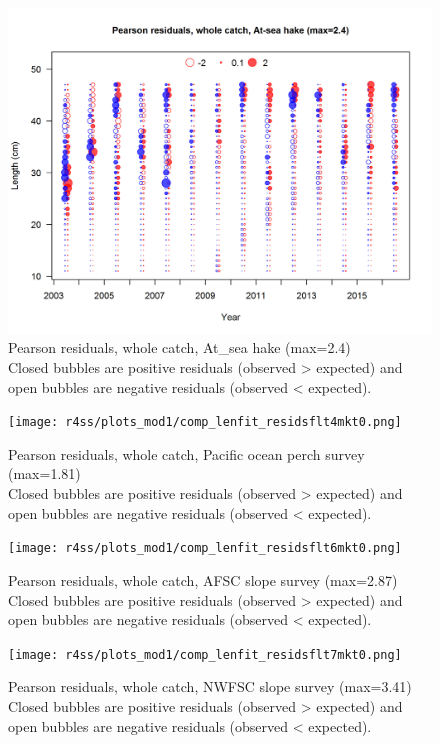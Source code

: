 \documentclass[12pt,]{article}
\begin{document}
\begin{figure}
\centering
\includegraphics{r4ss/plots_mod1/comp_lenfit_residsflt2mkt0.png}
\caption{Pearson residuals, whole catch, At\_sea hake (max=2.4)\\
Closed bubbles are positive residuals (observed \textgreater{} expected)
and open bubbles are negative residuals (observed \textless{} expected).
\label{fig:ashop_len_pearson}}
\end{figure}

\begin{figure}
\centering
\texttt{[image: r4ss/plots\_mod1/comp\_lenfit\_residsflt4mkt0.png]}
\caption{Pearson residuals, whole catch, Pacific ocean perch survey
(max=1.81)\\
Closed bubbles are positive residuals (observed \textgreater{} expected)
and open bubbles are negative residuals (observed \textless{} expected).
\label{fig:pop_len_pearson}}
\end{figure}

\begin{figure}
\centering
\texttt{[image: r4ss/plots\_mod1/comp\_lenfit\_residsflt6mkt0.png]}
\caption{Pearson residuals, whole catch, AFSC slope survey (max=2.87)\\
Closed bubbles are positive residuals (observed \textgreater{} expected)
and open bubbles are negative residuals (observed \textless{} expected).
\label{fig:afsc_len_pearson}}
\end{figure}

\begin{figure}
\centering
\texttt{[image: r4ss/plots\_mod1/comp\_lenfit\_residsflt7mkt0.png]}
\caption{Pearson residuals, whole catch, NWFSC slope survey (max=3.41)\\
Closed bubbles are positive residuals (observed \textgreater{} expected)
and open bubbles are negative residuals (observed \textless{} expected).
\label{fig:nwfsc_len_pearson}}
\end{figure}
\end{document}

